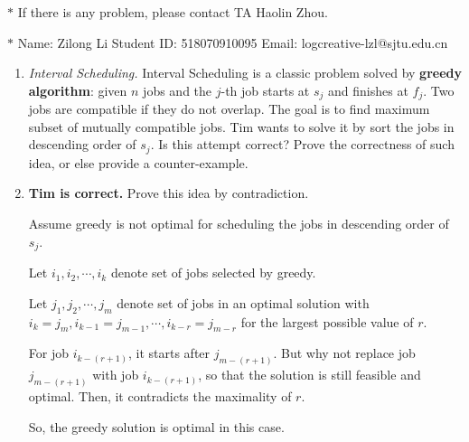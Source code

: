 \documentclass[12pt,a4paper]{article}
\makeatletter
\newtheorem*{solution}{Solution}
\theoremstyle{definition}
\renewenvironment{solution}[1][Solution] {\par\pushQED{\qed}\normalfont\topsep6\p@\@plus6\p@\relax\trivlist\item[\hskip\labelsep\bfseries#1\@addpunct{.}]\ignorespaces}{\popQED\endtrivlist\@endpefalse} \makeatother
\makeatother
\begin{document}
\noindent

\noindent{}


\begin{center}
\footnotesize{\color{red}$*$ If there is any problem, please contact TA Haolin Zhou.}\par
\footnotesize{\color{blue}$*$ Name: Zilong Li \quad Student ID: 518070910095 \quad Email: logcreative-lzl@sjtu.edu.cn}
\end{center}

\begin{enumerate}
	\item \textit{Interval Scheduling.} Interval Scheduling is a classic problem solved by \textbf{greedy algorithm}: given $n$ jobs and the $j$-th job starts at $s_j$ and finishes at $f_j$. Two jobs are compatible if they do not overlap. The goal is to find maximum subset of mutually compatible jobs. Tim wants to solve it by sort the jobs in descending order of $s_j$. Is this attempt correct? Prove the correctness of such idea, or else provide a counter-example.
	\begin{solution}
		\textbf{Tim is correct.} Prove this idea by contradiction.

		Assume greedy is not optimal for scheduling the jobs in descending order of $s_j$.

		Let $i_1,i_2,\cdots,i_k$ denote set of jobs selected by greedy.

		Let $j_1,j_2,\cdots,j_m$ denote set of jobs in an optimal solution with $i_k=j_m,i_{k-1}=j_{m-1},\cdots,i_{k-r}=j_{m-r}$ for the largest possible value of $r$.

		\begin{figure}[h]
			\centering
			
		\end{figure}

		For job $i_{k-(r+1)}$, it starts after $j_{m-(r+1)}$. But why not replace job $j_{m-(r+1)}$ with job $i_{k-(r+1)}$, so that the solution is still feasible and optimal. Then, it contradicts the maximality of $r$.

		So, the greedy solution is optimal in this case.
	\end{solution}
	

\end{enumerate}
\end{document}
